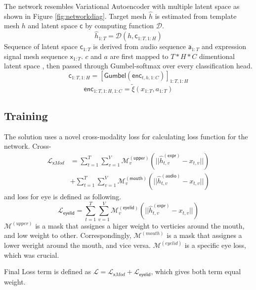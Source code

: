 \documentclass[10pt,twocolumn,letterpaper]{article}
\begin{document}
    The network resembles Variational Autoencoder with multiple latent space as shown in Figure \ref{fig:networkdiag}.
    Target mesh \(\hat{h}\) is estimated from template mesh \(h\) and latent space \(\mathsf{c}\) by computing function \(\mathcal{D}\).
    \begin{equation}
      \hat{h}_{1:T} = \mathcal{D}(h, \mathsf{c}_{1:T, 1:H})
      \label{eq:1}
    \end{equation}
    Sequence of latent space \(\mathsf{c}_{1:T}\) is derived from audio sequence \(\mathsf{a}_{1:T}\) and expression signal mesh sequence \(\mathsf{x}_{1:T}\).
    \(c\) and \(a\) are first mapped to \(T*H*C\) dimentional latent space \(\), then passed through Gumbel-softmax\cite{jang2017categorical} over every classification head.
    \begin{equation}
      \mathsf{c}_{1:T, 1:H} = [\mathsf{Gumbel}(\mathsf{enc}_{t,h,1:C})]_{1:T, 1:H}
    \end{equation}
    \begin{equation}
      \mathsf{enc}_{1:T,1:H,1:C} = \tilde{\xi}(x_{1:T}, a_{1:T}) 
    \end{equation}
  
    \pagebreak  
    
    \subsection{Training}
      The solution uses a novel cross-modality loss for calculating loss function for the network.
      Cross- 
      \begin{equation}
        \begin{split}
          \mathcal{L}_{\mathsf{x}Mod} &= 
            \sum_{t=1}^{T}
            \sum_{v=1}^{V}
            \mathcal{M}_v^{\mathsf{(upper)}}
            (||\hat{h}_{t,v}^{\mathsf{(expr)}} - x_{t,v}||)\\
            &+
            \sum_{t=1}^{T}
            \sum_{v=1}^{V}
            \mathcal{M}_v^{\mathsf{(mouth)}}
            (||\hat{h}_{t,v}^{\mathsf{(audio)}} - x_{t,v}||)  
        \end{split}
      \end{equation}
      and loss for eye is defined as following.
      \begin{equation}
          \mathcal{L}_{\mathsf{eyelid}} = 
            \sum_{t=1}^{T}
            \sum_{v=1}^{V}
            \mathcal{M}_v^{\mathsf{(eyelid)}}
            (||\hat{h}_{t,v}^{\mathsf{(expr)}} - x_{t,v}||)
      \end{equation}
      \(\mathcal{M}^{(upper)}\) is a mask that assignes a higer weight to verticies around the mouth, and low weight to other.
      Correspondingly, \(\mathcal{M}^{(mouth)}\) is a mask that assignes a lower weright around the mouth, and vice versa.
      \(\mathcal{M}^{(eyelid)}\) is a specific eye loss, which was crucial.
      
      Final Loss term is defined as \(\mathcal{L} =\mathcal{L}_{\mathsf{x}Mod}+\mathcal{L}_{\mathsf{eyelid}} \), which gives both term equal weight.



{
  \small
  
  
}
\end{document}
